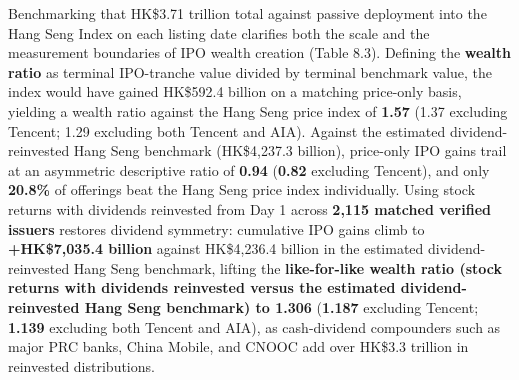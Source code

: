 \documentclass[11pt,letterpaper]{article}
\begin{document}
Benchmarking that HK\$3.71 trillion total against passive deployment into the Hang Seng Index on each listing date clarifies both the scale and the measurement boundaries of IPO wealth creation (Table 8.3). Defining the \textbf{wealth ratio} as terminal IPO-tranche value divided by terminal benchmark value, the index would have gained HK\$592.4 billion on a matching price-only basis, yielding a wealth ratio against the Hang Seng price index of \textbf{1.57} (1.37 excluding Tencent; 1.29 excluding both Tencent and AIA). Against the estimated dividend-reinvested Hang Seng benchmark (HK\$4,237.3 billion), price-only IPO gains trail at an asymmetric descriptive ratio of \textbf{0.94} (\textbf{0.82} excluding Tencent), and only \textbf{20.8\%} of offerings beat the Hang Seng price index individually. Using stock returns with dividends reinvested from Day 1 across \textbf{2,115 matched verified issuers} restores dividend symmetry: cumulative IPO gains climb to \textbf{+HK\$7,035.4 billion} against HK\$4,236.4 billion in the estimated dividend-reinvested Hang Seng benchmark, lifting the \textbf{like-for-like wealth ratio (stock returns with dividends reinvested versus the estimated dividend-reinvested Hang Seng benchmark) to 1.306} (\textbf{1.187} excluding Tencent; \textbf{1.139} excluding both Tencent and AIA), as cash-dividend compounders such as major PRC banks, China Mobile, and CNOOC add over HK\$3.3 trillion in reinvested distributions.
\end{document}
